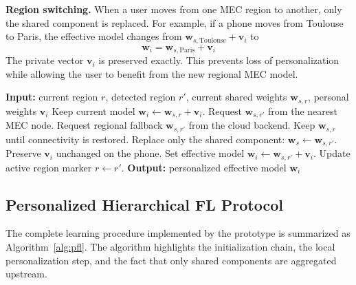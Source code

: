 \documentclass[lettersize,journal]{IEEEtran}
\begin{document}
\textbf{Region switching.}
When a user moves from one MEC region to another, only the shared
component is replaced. For example, if a phone moves from Toulouse to
Paris, the effective model changes from
$\mathbf{w}_{s,\mathrm{Toulouse}}+\mathbf{v}_i$ to
\begin{equation}
    \mathbf{w}_i =
    \mathbf{w}_{s,\mathrm{Paris}} + \mathbf{v}_i
\end{equation}
The private vector $\mathbf{v}_i$ is preserved exactly. This prevents
loss of personalization while allowing the user to benefit from the new
regional MEC model.

\begin{algorithm}[!t]
\caption{Region switching while preserving personalization}
\label{alg:region_switching}
\begin{algorithmic}[1]
\STATE \textbf{Input:} current region $r$, detected region $r'$,
current shared weights $\mathbf{w}_{s,r}$, personal weights
$\mathbf{v}_i$
    \STATE Keep current model
    $\mathbf{w}_i \leftarrow \mathbf{w}_{s,r}+\mathbf{v}_i$.
\ELSE
    \STATE Request $\mathbf{w}_{s,r'}$ from the nearest MEC node.
        \STATE Request regional fallback
        $\mathbf{w}_{s,r'}$ from the cloud backend.
    \ENDIF
        \STATE Keep $\mathbf{w}_{s,r}$ until connectivity is restored.
    \ELSE
        \STATE Replace only the shared component:
        $\mathbf{w}_s \leftarrow \mathbf{w}_{s,r'}$.
        \STATE Preserve $\mathbf{v}_i$ unchanged on the phone.
        \STATE Set effective model
        $\mathbf{w}_i \leftarrow \mathbf{w}_{s,r'}+\mathbf{v}_i$.
        \STATE Update active region marker $r \leftarrow r'$.
    \ENDIF
\ENDIF
\STATE \textbf{Output:} personalized effective model $\mathbf{w}_i$
\end{algorithmic}
\end{algorithm}

\subsection{Personalized Hierarchical FL Protocol}

The complete learning procedure implemented by the prototype is
summarized as Algorithm~\ref{alg:pfl}. The algorithm highlights the
initialization chain, the local personalization step, and the fact that
only shared components are aggregated upstream.
\end{document}
